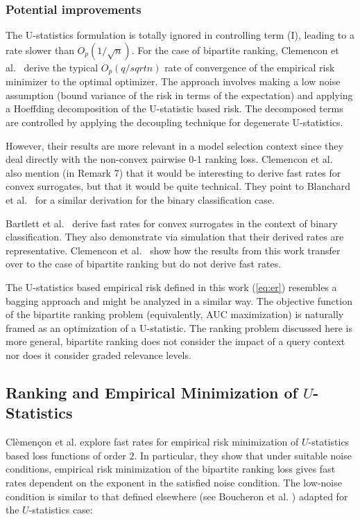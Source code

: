 \documentclass[a4paper,10pt]{article}
\begin{document}
\subsubsection{Potential improvements}
The U-statistics formulation is totally ignored in controlling term
(I), leading to a rate slower than \(O_p(1/\sqrt n)\). For the case of
bipartite ranking, Clemencon et
al.~\cite{clemencon-2008-ranking-rates} derive the typical \(O_p(q/sqrt n)\) rate of
convergence of the empirical risk minimizer to the optimal
optimizer. The approach involves making a low noise assumption (bound
variance of the risk in terms of the expectation) and applying a
Hoeffding decomposition of the U-statistic based risk. The decomposed
terms are controlled by applying the decoupling technique for
degenerate U-statistics.

However, their results are more relevant in a
model selection context since they deal directly with the non-convex
pairwise 0-1 ranking loss. Clemencon et
al.~\cite{clemencon-2008-ranking-rates} also mention (in Remark 7)
that it would be interesting to derive fast rates for convex
surrogates, but that it would be quite technical. They point to
Blanchard et al.~\cite{blanchard-2003-rates} for a similar derivation
for the binary classification case.

Bartlett et al.~\cite{bartlett-2006-risk} derive fast rates for convex
surrogates in the context of binary classification. They also
demonstrate via simulation that their derived rates are
representative. Clemencon et al.~\cite{clemencon-2008-ranking-rates}
show how the results from this work transfer over to the case of
bipartite ranking but do not derive fast rates.

The U-statistics based empirical risk defined in this work
(\ref{eq:er}) resembles a bagging approach and might be analyzed in a
similar way. The objective function of the bipartite ranking problem
\cite{clemencon-2008-ranking-rates} (equivalently, AUC maximization)
is naturally framed as an optimization of a U-statistic. The ranking
problem discussed here is more general, bipartite ranking does not
consider the impact of a query context nor does it consider graded
relevance levels.

\subsection{Ranking and Empirical Minimization of $U$-Statistics}
Cl\`{e}men\c{c}on et al. \cite{clemencon-2008-ranking-rates} explore
fast rates for empirical risk minimization of $U$-statistics based
loss functions of order $2$. In particular, they show that under
suitable noise conditions, empirical risk minimization of the
bipartite ranking loss gives fast rates dependent on the exponent in
the satisfied noise condition. The low-noise condition is similar to
that defined elsewhere (see Boucheron et
al. \cite{boucheron-2005-fast-rates}) adapted for the $U$-statistics case:
\end{document}
